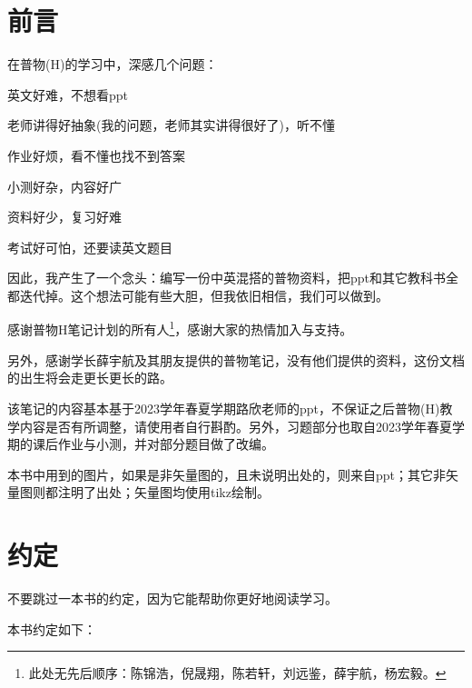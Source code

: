 \chapter{前言}
在普物(H)的学习中，深感几个问题：
\begin{Itemize}
    \item 英文好难，不想看ppt
    \item 老师讲得好抽象(我的问题，老师其实讲得很好了)，听不懂
    \item 作业好烦，看不懂也找不到答案
    \item 小测好杂，内容好广
    \item 资料好少，复习好难
    \item 考试好可怕，还要读英文题目
\end{Itemize}

因此，我产生了一个念头：编写一份中英混搭的普物资料，把ppt和其它教科书全都迭代掉。这个想法可能有些大胆，但我依旧相信，我们可以做到。

感谢普物H笔记计划的所有人\footnote{此处无先后顺序：陈锦浩，倪晟翔，陈若轩，刘远鉴，薛宇航，杨宏毅。}，感谢大家的热情加入与支持。

另外，感谢学长薛宇航及其朋友提供的普物笔记，没有他们提供的资料，这份文档的出生将会走更长更长的路。

该笔记的内容基本基于2023学年春夏学期路欣老师的ppt，不保证之后普物(H)教学内容是否有所调整，请使用者自行斟酌。另外，习题部分也取自2023学年春夏学期的课后作业与小测，并对部分题目做了改编。

本书中用到的图片，如果是非矢量图的，且未说明出处的，则来自ppt；其它非矢量图则都注明了出处；矢量图均使用tikz绘制。
\chapter{约定}
不要跳过一本书的约定，因为它能帮助你更好地阅读学习。

本书约定如下：
\setcounter{chapter}{-1}


